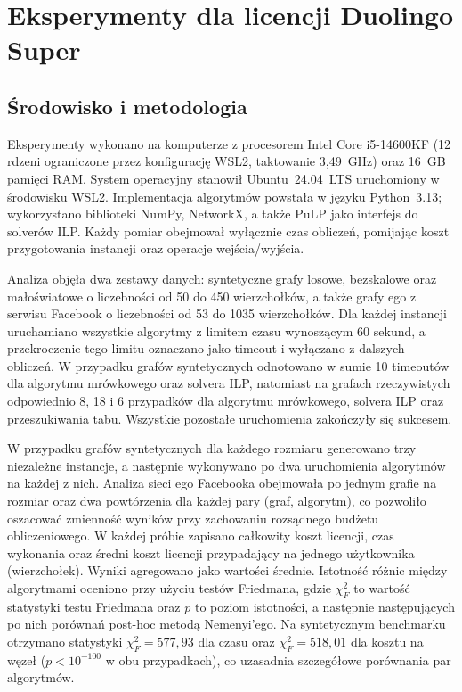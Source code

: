 \chapter{Eksperymenty dla licencji Duolingo Super}
\label{chap:experiments}
\section{Środowisko i metodologia}

Eksperymenty wykonano na komputerze z procesorem Intel Core i5-14600KF (12 rdzeni ograniczone przez konfigurację WSL2, taktowanie 3,49~GHz) oraz 16~GB pamięci RAM. System operacyjny stanowił Ubuntu~24.04~LTS uruchomiony w środowisku WSL2. Implementacja algorytmów powstała w języku Python~3.13; wykorzystano biblioteki NumPy, NetworkX, a także PuLP jako interfejs do solverów ILP. Każdy pomiar obejmował wyłącznie czas obliczeń, pomijając koszt przygotowania instancji oraz operacje wejścia/wyjścia.

Analiza objęła dwa zestawy danych: syntetyczne grafy losowe, bezskalowe oraz małoświatowe o liczebności od 50 do 450 wierzchołków, a także grafy ego z serwisu Facebook o liczebności od 53 do 1035 wierzchołków. Dla każdej instancji uruchamiano wszystkie algorytmy z limitem czasu wynoszącym 60 sekund, a przekroczenie tego limitu oznaczano jako timeout i wyłączano z dalszych obliczeń. W przypadku grafów syntetycznych odnotowano w sumie 10 timeoutów dla algorytmu mrówkowego oraz solvera ILP, natomiast na grafach rzeczywistych odpowiednio 8, 18 i 6 przypadków dla algorytmu mrówkowego, solvera ILP oraz przeszukiwania tabu. Wszystkie pozostałe uruchomienia zakończyły się sukcesem.

W przypadku grafów syntetycznych dla każdego rozmiaru generowano trzy niezależne instancje, a następnie wykonywano po dwa uruchomienia algorytmów na każdej z nich. Analiza sieci ego Facebooka obejmowała po jednym grafie na rozmiar oraz dwa powtórzenia dla każdej pary (graf, algorytm), co pozwoliło oszacować zmienność wyników przy zachowaniu rozsądnego budżetu obliczeniowego. W każdej próbie zapisano całkowity koszt licencji, czas wykonania oraz średni koszt licencji przypadający na jednego użytkownika (wierzchołek). Wyniki agregowano jako wartości średnie. Istotność różnic między algorytmami oceniono przy użyciu testów Friedmana, gdzie $\chi^2_F$ to wartość statystyki testu Friedmana oraz $p$ to poziom istotności, a następnie następujących po nich porównań post-hoc metodą Nemenyi'ego. Na syntetycznym benchmarku otrzymano statystyki $\chi^2_F = 577{,}93$ dla czasu oraz $\chi^2_F = 518{,}01$ dla kosztu na węzeł ($p < 10^{-100}$ w obu przypadkach), co uzasadnia szczegółowe porównania par algorytmów.

